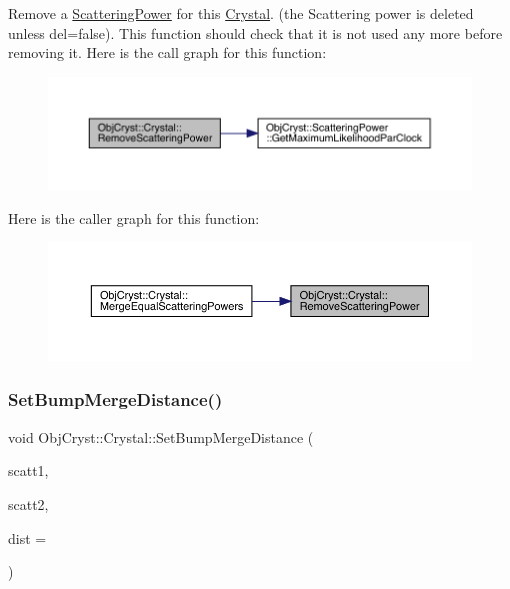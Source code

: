 Remove a \mbox{\hyperlink{class_obj_cryst_1_1_scattering_power}{Scattering\+Power}} for this \mbox{\hyperlink{class_obj_cryst_1_1_crystal}{Crystal}}. (the Scattering power is deleted unless del=false). This function should check that it is not used any more before removing it. Here is the call graph for this function\+:
\nopagebreak
\begin{figure}[H]
\begin{center}
\leavevmode
\includegraphics[width=350pt]{class_obj_cryst_1_1_crystal_aba839003a614634d7d6d9217379ae692_cgraph}
\end{center}
\end{figure}
Here is the caller graph for this function\+:
\nopagebreak
\begin{figure}[H]
\begin{center}
\leavevmode
\includegraphics[width=350pt]{class_obj_cryst_1_1_crystal_aba839003a614634d7d6d9217379ae692_icgraph}
\end{center}
\end{figure}
\mbox{\label{class_obj_cryst_1_1_crystal_ad77bfe72588a64e306a5514535ed7404}} 
\subsubsection{\texorpdfstring{SetBumpMergeDistance()}{SetBumpMergeDistance()}}
{\footnotesize\ttfamily void Obj\+Cryst\+::\+Crystal\+::\+Set\+Bump\+Merge\+Distance (\begin{DoxyParamCaption}\item[{const \mbox{\hyperlink{class_obj_cryst_1_1_scattering_power}{Scattering\+Power}} \&}]{scatt1,  }\item[{const \mbox{\hyperlink{class_obj_cryst_1_1_scattering_power}{Scattering\+Power}} \&}]{scatt2,  }\item[{const R\+E\+AL}]{dist = {} }\end{DoxyParamCaption})}

